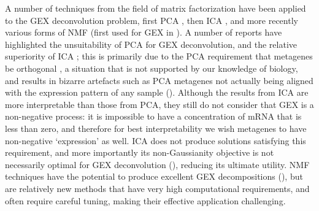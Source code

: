 \documentclass[dissertation.tex]{subfiles}
\begin{document}
A number of techniques from the field of matrix factorization have been applied to the \gls{GEX} deconvolution problem, first \gls{PCA} \cite{Alter2000}, then \gls{ICA} \cite{Liebermeister2002}, and more recently various forms of \gls{NMF} (first used for \gls{GEX} in \cite{Brunet2004}).  A number of reports have highlighted the unsuitability of \gls{PCA} for \gls{GEX} deconvolution, and the relative superiority of \gls{ICA} \cite{Lee2003, Saidi2004, Teschendorff2007}; this is primarily due to the \gls{PCA} requirement that metagenes be orthogonal \cite{Lewicki2000}, a situation that is not supported by our knowledge of biology, and results in bizarre artefacts such as \gls{PCA} metagenes not actually being aligned with the expression pattern of any sample ().  Although the results from \gls{ICA} are more interpretable than those from \gls{PCA}, they still do not consider that \gls{GEX} is a non-negative process: it is impossible to have a concentration of mRNA that is less than zero, and therefore for best interpretability we wish metagenes to have non-negative `expression' as well.  \gls{ICA} does not produce solutions satisfying this requirement, and more importantly its non-Gaussianity objective is not necessarily optimal for \gls{GEX} deconvolution (), reducing its ultimate utility.  \gls{NMF} techniques have the potential to produce excellent \gls{GEX} decompositions (), but are relatively new methods that have very high computational requirements, and often require careful tuning, making their effective application challenging.
\end{document}
